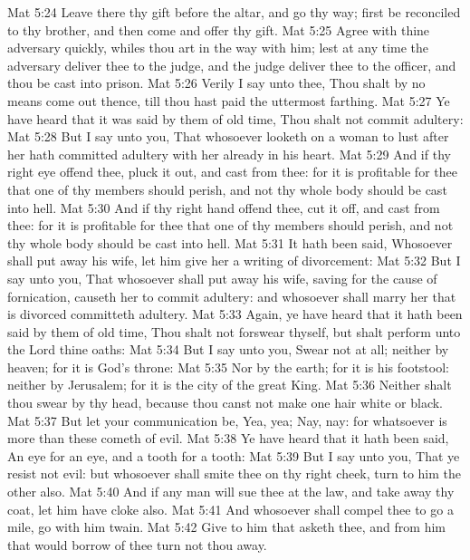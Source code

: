 \vs Mat 5:24 Leave there thy gift before the altar, and go thy way; first be reconciled to thy brother, and then come and offer thy gift.
\vs Mat 5:25 Agree with thine adversary quickly, whiles thou art in the way with him; lest at any time the adversary deliver thee to the judge, and the judge deliver thee to the officer, and thou be cast into prison.
\vs Mat 5:26 Verily I say unto thee, Thou shalt by no means come out thence, till thou hast paid the uttermost farthing.
\vs Mat 5:27 Ye have heard that it was said by them of old time, Thou shalt not commit adultery:
\vs Mat 5:28 But I say unto you, That whosoever looketh on a woman to lust after her hath committed adultery with her already in his heart.
\vs Mat 5:29 And if thy right eye offend thee, pluck it out, and cast  from thee: for it is profitable for thee that one of thy members should perish, and not  thy whole body should be cast into hell.
\vs Mat 5:30 And if thy right hand offend thee, cut it off, and cast  from thee: for it is profitable for thee that one of thy members should perish, and not  thy whole body should be cast into hell.
\vs Mat 5:31 It hath been said, Whosoever shall put away his wife, let him give her a writing of divorcement:
\vs Mat 5:32 But I say unto you, That whosoever shall put away his wife, saving for the cause of fornication, causeth her to commit adultery: and whosoever shall marry her that is divorced committeth adultery.
\vs Mat 5:33 Again, ye have heard that it hath been said by them of old time, Thou shalt not forswear thyself, but shalt perform unto the Lord thine oaths:
\vs Mat 5:34 But I say unto you, Swear not at all; neither by heaven; for it is God's throne:
\vs Mat 5:35 Nor by the earth; for it is his footstool: neither by Jerusalem; for it is the city of the great King.
\vs Mat 5:36 Neither shalt thou swear by thy head, because thou canst not make one hair white or black.
\vs Mat 5:37 But let your communication be, Yea, yea; Nay, nay: for whatsoever is more than these cometh of evil.
\vs Mat 5:38 Ye have heard that it hath been said, An eye for an eye, and a tooth for a tooth:
\vs Mat 5:39 But I say unto you, That ye resist not evil: but whosoever shall smite thee on thy right cheek, turn to him the other also.
\vs Mat 5:40 And if any man will sue thee at the law, and take away thy coat, let him have  cloke also.
\vs Mat 5:41 And whosoever shall compel thee to go a mile, go with him twain.
\vs Mat 5:42 Give to him that asketh thee, and from him that would borrow of thee turn not thou away.
